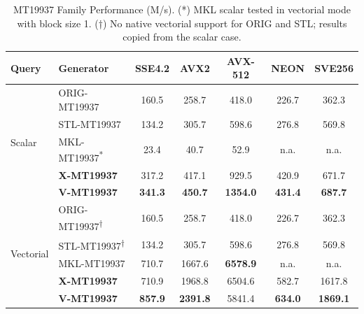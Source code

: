 \documentclass[preprint,1p,times]{elsarticle}
\begin{document}
\begin{table}[H]
\centering
\small
\begin{tabular}{|l|l|c|c|c|c|c|}
\hline
\textbf{Query} & \textbf{Generator} & \textbf{SSE4.2} & \textbf{AVX2} & \textbf{AVX-512} & \textbf{NEON} & \textbf{SVE256} \\
\hline
\multirow{5}{*}{Scalar}
 & ORIG-MT19937 & 160.5 & 258.7 & 418.0 & 226.7 & 362.3 \\
 & STL-MT19937  & 134.2 & 305.7 & 598.6 & 276.8 & 569.8 \\
 & MKL-MT19937\textsuperscript{*} & 23.4 & 40.7 & 52.9 & n.a. & n.a. \\
 & \textbf{X-MT19937} & 317.2 & 417.1 & 929.5 & 420.9 & 671.7 \\
 & \textbf{V-MT19937} & \textbf{341.3} & \textbf{450.7} & \textbf{1354.0} & \textbf{431.4} & \textbf{687.7} \\
\hline
\multirow{5}{*}{Vectorial}
 & ORIG-MT19937\textsuperscript{†} & 160.5 & 258.7 & 418.0 & 226.7 & 362.3 \\
 & STL-MT19937\textsuperscript{†}  & 134.2 & 305.7 & 598.6 & 276.8 & 569.8 \\
 & MKL-MT19937 & 710.7 & 1667.6 & \textbf{6578.9} & n.a. & n.a. \\
 & \textbf{X-MT19937} & 710.9 & 1968.8 & 6504.6 & 582.7 & 1617.8 \\
 & \textbf{V-MT19937} & \textbf{857.9} & \textbf{2391.8} & 5841.4 & \textbf{634.0} & \textbf{1869.1} \\
\hline
\end{tabular}
\caption{\label{table:mt32} MT19937 Family Performance (M/s).
	(*) MKL scalar tested in vectorial mode with block size 1.
	(†) No native vectorial support for ORIG and STL; results copied from the scalar case.
	}
\end{table}
\end{document}
